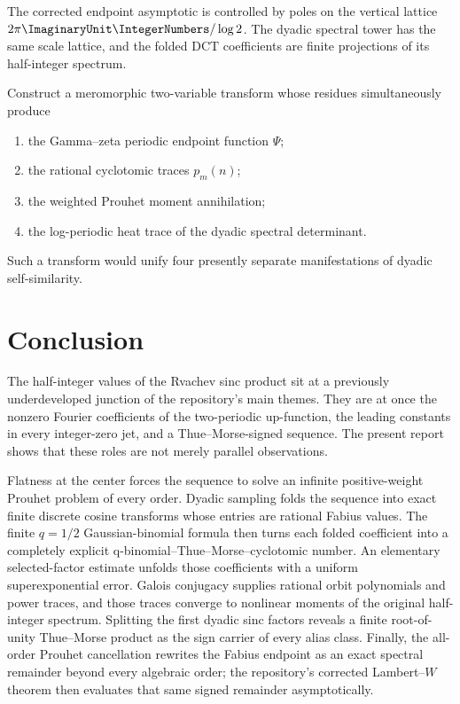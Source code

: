 \documentclass[11pt,oneside]{article}
\theoremstyle{definition}
\theoremstyle{remark}
\begin{document}
The corrected endpoint asymptotic is controlled by poles on the vertical
lattice $2\pi\ImaginaryUnit\IntegerNumbers/\log2$.  The dyadic spectral tower has the same scale lattice,
and the folded DCT coefficients are finite projections of its half-integer
spectrum.

\begin{problem}\label{p1:prob:two-variable-transform}
Construct a meromorphic two-variable transform whose residues simultaneously
produce
\begin{enumerate}
 \item the Gamma--zeta periodic endpoint function $\Psi$;
 \item the rational cyclotomic traces $p_m(n)$;
 \item the weighted Prouhet moment annihilation;
 \item the log-periodic heat trace of the dyadic spectral determinant.
\end{enumerate}
Such a transform would unify four presently separate manifestations of dyadic
self-similarity.
\end{problem}

\section{Conclusion}\label{p1:sec:conclusion}

The half-integer values of the Rvachev sinc product sit at a previously
underdeveloped junction of the repository's main themes.  They are at once the
nonzero Fourier coefficients of the two-periodic up-function, the leading
constants in every integer-zero jet, and a Thue--Morse-signed sequence.  The
present report shows that these roles are not merely parallel observations.

Flatness at the center forces the sequence to solve an infinite positive-weight
Prouhet problem of every order.  Dyadic sampling folds the sequence into exact
finite discrete cosine transforms whose entries are rational Fabius values.
The finite $q=1/2$ Gaussian-binomial formula then turns each folded coefficient
into a completely explicit q-binomial--Thue--Morse--cyclotomic number.  An
elementary selected-factor estimate unfolds those coefficients with a uniform
superexponential error.  Galois conjugacy supplies rational orbit polynomials
and power traces, and those traces converge to nonlinear moments of the original
half-integer spectrum.  Splitting the first dyadic sinc factors reveals a finite
root-of-unity Thue--Morse product as the sign carrier of every alias class.
Finally, the all-order Prouhet cancellation rewrites the Fabius endpoint as an
exact spectral remainder beyond every algebraic order; the repository's
corrected Lambert--$W$ theorem then evaluates that same signed remainder
asymptotically.
\end{document}
